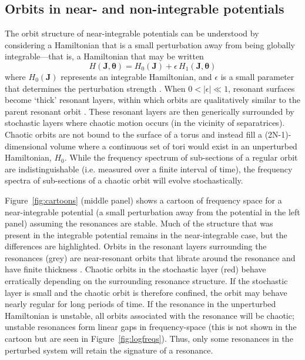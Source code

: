 \documentclass[letterpaper,12pt,preprint]{aastex}
\newcommand{\bs}[1]{\boldsymbol{#1}}
\begin{document}
\subsection{Orbits in near- and non-integrable potentials}

The orbit structure of near-integrable potentials can be understood by considering a Hamiltonian that is a small perturbation away from being globally integrable---that is, a Hamiltonian that may be written
\begin{equation}
	H(\boldsymbol{J}, \boldsymbol{\theta}) = H_0(\boldsymbol{J}) + \epsilon \, H_1(\boldsymbol{J}, \boldsymbol{\theta})
\end{equation}
where $H_0(\bs{J})$ represents an integrable Hamiltonian, and $\epsilon$ is a small parameter that determines the perturbation strength \citep[a description of perturbation theory applied to nonlinear Hamiltonians is given in][]{lichtenberg83}. When $0 < |\epsilon| \ll 1$, resonant surfaces become `thick' resonant layers, within which orbits are qualitatively similar to the parent resonant orbit \citep[e.g.,][]{merritt99}. These resonant layers are then generically surrounded by stochastic layers where chaotic motion occurs (in the vicinity of separatrices). Chaotic orbits are not bound to the surface of a torus and instead fill a (2N-1)-dimensional volume where a continuous set of tori would exist in an unperturbed Hamiltonian, $H_0$. While the frequency spectrum of sub-sections of a regular orbit are indistinguishable (i.e. measured over a finite interval of time), the frequency spectra of sub-sections of a chaotic orbit will evolve stochastically.

Figure~\ref{fig:cartoons} (middle panel) shows a cartoon of frequency space for a near-integrable potential (a small perturbation away from the potential in the left panel) assuming the resonances are stable. Much of the structure that was present in the integrable potential remains in the near-integrable case, but the differences are highlighted. Orbits in the resonant layers surrounding the resonances (grey) are near-resonant orbits that librate around the resonance and have finite thickness \citep[e.g.,][]{merritt99}. Chaotic orbits in the stochastic layer (red) behave erratically depending on the surrounding resonance structure. If the stochastic layer is small and the chaotic orbit is therefore confined, the orbit may behave nearly regular for long periods of time. If the resonance in the unperturbed Hamiltonian is unstable, all orbits associated with the resonance will be chaotic; unstable resonances form linear gaps in frequency-space (this is not shown in the cartoon but are seen in Figure~\ref{fig:logfreqs}). Thus, only some resonances in the perturbed system will retain the signature of a resonance.
\end{document}
